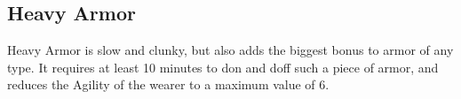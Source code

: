 \subsection{Heavy Armor}

Heavy Armor is slow and clunky, but also adds the biggest bonus to armor of any type. It requires at least 10 minutes to don and doff such a piece of armor, and reduces the Agility of the wearer to a maximum value of 6.